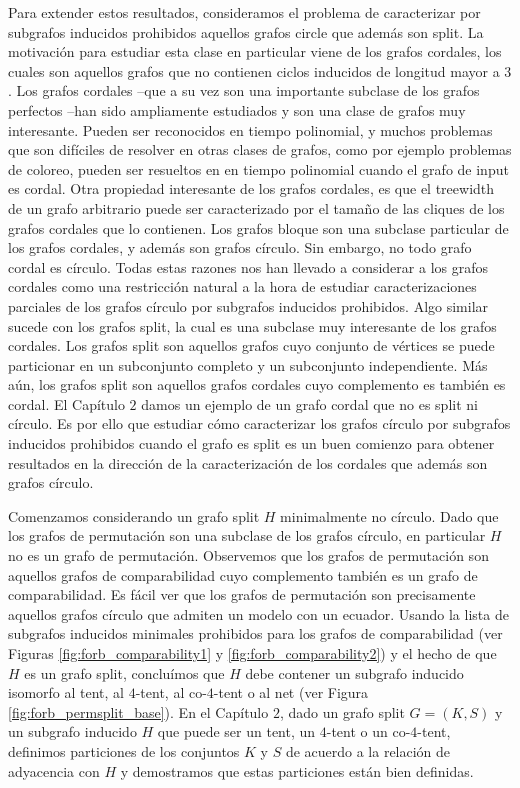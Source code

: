\documentclass[12pt]{book}
\theoremstyle{plain}
\theoremstyle{remark}
\begin{document}
Para extender estos resultados, consideramos el problema de caracterizar por sub\-grafos inducidos prohibidos aquellos grafos circle que además son split.
La motivación para estudiar esta clase en particular viene de los grafos cordales, los cuales son aquellos grafos que no contienen ciclos inducidos de longitud mayor a $3$. Los grafos cordales --que a su vez son una importante subclase de los grafos perfectos --han sido ampliamente estudiados y son una clase de grafos muy interesante. Pueden ser reconocidos en tiempo polinomial, y muchos problemas que son difíciles de resolver en otras clases de grafos, como por ejemplo problemas de coloreo, pueden ser resueltos en en tiempo polinomial cuando el grafo de input es cordal. Otra propiedad interesante de los grafos cordales, es que el treewidth de un grafo arbitrario puede ser caracterizado por el tamaño de las cliques de los grafos cordales que lo contienen. Los grafos bloque son una subclase particular de los grafos cordales, y además son grafos círculo. Sin embargo, no todo grafo cordal es círculo. Todas estas razones nos han llevado a considerar a los grafos cordales como una restricción natural a la hora de estudiar caracterizaciones parciales de los grafos círculo por subgrafos inducidos prohibidos. Algo similar sucede con los grafos split, la cual es una subclase muy interesante de los grafos cordales. 
Los grafos split son aquellos grafos cuyo conjunto de vértices se puede particionar en un subconjunto completo y un subconjunto independiente. Más aún, los grafos split son aquellos grafos cordales cuyo complemento es también es cordal. El Capítulo $2$ damos un ejemplo de un grafo cordal que no es split ni círculo. Es por ello que estudiar cómo caracterizar los grafos círculo por subgrafos inducidos prohibidos cuando el grafo es split es un buen comienzo para obtener resultados en la dirección de la caracterización de los cordales que además son grafos círculo.

Comenzamos considerando un grafo split $H$ minimalmente no círculo. Dado que los grafos de permutación son una subclase de los grafos círculo, en particular $H$ no es un grafo de permutación. Observemos que los grafos de permutación son aquellos grafos de comparabilidad cuyo com\-ple\-men\-to también es un grafo de comparabilidad. Es fácil ver que los grafos de permutación son precisamente aquellos grafos círculo que admiten un modelo con un ecuador. 
Usando la lista de subgrafos inducidos minimales prohibidos para los grafos de comparabilidad (ver Figuras \ref{fig:forb_comparability1} y \ref{fig:forb_comparability2}) y el hecho de que $H$ es un grafo split, concluímos que $H$ debe contener un subgrafo inducido isomorfo al tent, al $4$-tent, al co-$4$-tent o al net (ver Figura \ref{fig:forb_permsplit_base}).
En el Capítulo $2$, dado un grafo split $G=(K,S)$ y un subgrafo inducido $H$ que puede ser un tent, un $4$-tent o un co-$4$-tent, definimos particiones de los conjuntos $K$ y $S$ de acuerdo a la relación de adyacencia con $H$ y demostramos que estas particiones están bien definidas. 
\end{document}
